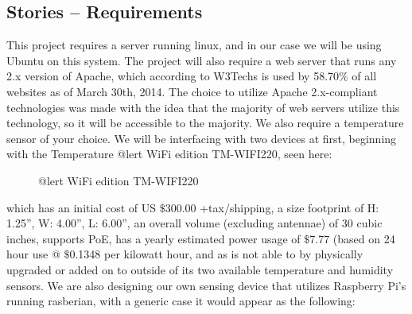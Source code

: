 \documentclass{report}
\begin{document}
\subsection*{Stories -- Requirements}
This project requires a server running linux, and in our case we will be using Ubuntu on this system. The project will also require a web server that runs any 2.x version of Apache, which according to W3Techs is used by 58.70$\%$ of all websites as of March 30th, 2014.  The choice to utilize Apache 2.x-compliant technologies was made with the idea that the majority of web servers utilize this technology, so it will be accessible to the majority. We also require a temperature sensor of your choice. We will be interfacing with two devices at first, beginning with the Temperature @lert WiFi edition TM-WIFI220, seen here:
\begin{figure}[H]
\caption{@lert WiFi edition TM-WIFI220}
\end{figure}
 which has an initial cost of US $\$$300.00 +tax/shipping, a size footprint of H: 1.25”, W: 4.00”, L: 6.00”, an overall volume (excluding antennae) of 30 cubic inches, supports PoE, has a yearly estimated power usage of $\$$7.77 (based on 24 hour use @ $\$$0.1348 per kilowatt hour, and as is not able to by physically upgraded or added on to outside of its two available temperature and humidity sensors.
\newline
\indent
We are also designing our own sensing device that utilizes Raspberry Pi’s running rasberian, with a generic case it would appear as the following:
\end{document}
